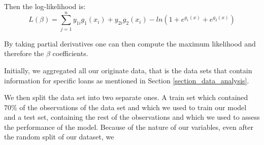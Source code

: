     Then the log-likelihood is:
    \begin{equation}
        L(\beta) = \sum_{j=1}^{n} y_{1i}g_1(x_i) + y_{2i}g_2(x_i) - ln(1 + e^{g_1(x)} + e^{g_2(x)})
    \end{equation}
    
    By taking partial derivatives one can then compute the maximum likelihood and therefore the $\beta$ coefficients. 
    
    

    Initially, we aggregated all our originate data, that is the data 
    sets that contain information for specific loans as mentioned in 
    Section \ref{section_data_analysis}.

    We then split the data set into two separate ones. A train set 
    which contained 70\% of the observations of the data set and which 
    we used to train our model and a test set, containing the rest of 
    the observations and which we used to assess the performance of the 
    model.
    Because of the nature of our variables, even after the random split of our dataset, we 



